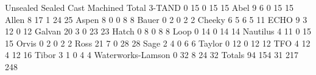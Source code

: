                   Unsealed Sealed Cast Machined Total
3-TAND                   0     15    0       15    15
Abel                     9      6    0       15    15
Allen                    8     17    1       24    25
Aspen                    8      0    0        8     8
Bauer                    0      2    0        2     2
Cheeky                   6      5    6        5    11
ECHO                     9      3   12        0    12
Galvan                  20      3    0       23    23
Hatch                    0      8    0        8     8
Loop                     0     14    0       14    14
Nautilus                 4     11    0       15    15
Orvis                    0      2    0        2     2
Ross                    21      7    0       28    28
Sage                     2      4    0        6     6
Taylor                   0     12    0       12    12
TFO                      4     12    4       12    16
Tibor                    3      1    0        4     4
Waterworks-Lamson        0     32    8       24    32
Totals                  94    154   31      217   248
